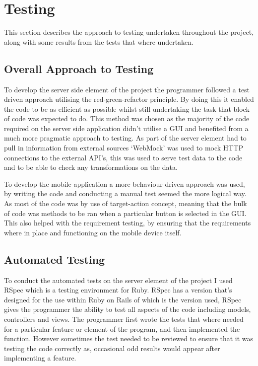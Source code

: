 \chapter{Testing}

	This section describes the approach to testing undertaken throughout the project, along with some results from the tests that where undertaken.

\section{Overall Approach to Testing}
	To develop the server side element of the project the programmer followed a test driven approach utilising the red-green-refactor principle.  By doing this it enabled the code to be as efficient as possible whilst still undertaking the task that block of code was expected to do. This method was chosen as the majority of the code required on the server side application didn't utilise a GUI and benefited from a much more pragmatic  approach to testing. As part of the server element had to pull in information from external sources `WebMock' was used to mock HTTP connections to the external API's, this was used to serve test data to the code and to be able to check any transformations on the data. 

	To develop the mobile application a more behaviour driven approach was used, by writing the code and conducting  a manual test seemed the more logical way. As most of the code was by use of target-action concept, meaning that the bulk of code was methods to be ran when a particular button is selected in the GUI. This also helped with the requirement testing, by ensuring that the requirements where in place and functioning on the mobile device itself. 
	
\section{Automated Testing}
	To conduct the automated tests on the server element of the project I used RSpec which is a testing environment for Ruby. RSpec has a version that's designed for the use within Ruby on Rails of which is the version used, RSpec gives the programmer the ability to test all aspects of the code including models, controllers and views. The programmer first wrote the tests that where needed for a particular feature or element of the program, and then implemented the function. However sometimes the test needed to be reviewed to ensure that it was testing the code correctly as, occasional odd results would appear after implementing a feature. 

